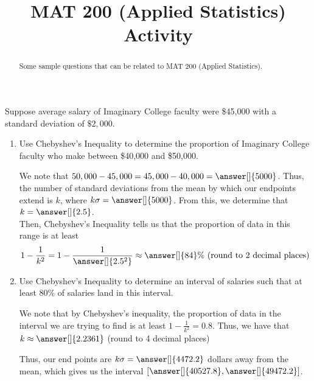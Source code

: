 \documentclass{ximera}
\title{MAT 200 (Applied Statistics) Activity}
\begin{document}
      
\begin{abstract}
      
Some sample questions that can be related to MAT 200 (Applied Statistics).
      
\end{abstract}
      
\maketitle
      
      
      
\begin{question}
Suppose average salary of Imaginary College faculty were \$45,000 with a standard deviation of $\$2,000$.

\begin{enumerate}
\item Use Chebyshev's Inequality to determine the proportion of Imaginary College faculty who make between \$40,000 and \$50,000.\\ 

\begin{explanation}
We note that $50,000-45,000=45,000-40,000=\answer[]{5000}$.  Thus, the number of standard deviations from the mean by which our endpoints extend is $k$, where $k\sigma=\answer[]{5000}$.  From this, we determine that $k=\answer[]{2.5}$.\\

Then, Chebyshev's Inequality tells us that the proportion of data in this range is at least $$1-\frac{1}{k^2}=1-\frac{1}{\answer[]{2.5^2}}\approx \answer[]{84}\%\ \text{(round to 2 decimal places)}$$
\end{explanation}

\item Use Chebyshev's Inequality to determine an interval of salaries such that at least 80\% of salaries land in this interval.

\begin{explanation}
We note that by Chebyshev's inequality, the proportion of data in the interval we are trying to find is at least $1-\frac{1}{k^2}=0.8$.  Thus, we have that $k\approx \answer[]{2.2361}$ (round to 4 decimal places)

Thus, our end points are $k\sigma=\answer[]{4472.2}$ dollars away from the mean, which gives us the interval $[\answer[]{40527.8}, \answer[]{49472.2}]$.
\end{explanation}
\end{enumerate}

\end{question}
\end{document}
